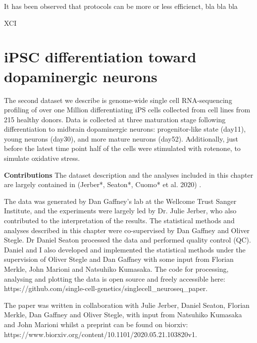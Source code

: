 It has been observed that protocols can be more or less efficienct, bla bla bla

XCI




\newpage


\section{iPSC differentiation toward dopaminergic neurons}

The second dataset we describe is genome-wide single cell RNA-sequencing profiling of over one Million differentiating iPS cells collected from cell lines from 215 healthy donors. 
Data is collected at three maturation stage following differentiation to midbrain dopaminergic neurons: progenitor-like state (day11), young neurons (day30), and more mature neurons (day52). 
Additionally, just before the latest time point half of the cells were stimulated with rotenone, to simulate oxidative stress. 

\vspace{5mm}

\begin{Abstract}

\hspace{-3mm}\textbf{Contributions} The dataset description and the analyses included in this chapter are largely contained in (Jerber*, Seaton*, Cuomo* et al. 2020) \cite{jerber2020population}.

\vspace{5mm}

The data was generated by Dan Gaffney’s lab at the Wellcome Trust Sanger Institute, and the experiments were largely led by Dr. Julie Jerber, who also contributed to the interpretation of the results. 
The statistical methods and analyses described in this chapter were co-supervised by Dan Gaffney and Oliver Stegle. 
Dr Daniel Seaton processed the data and performed quality control (QC). 
Daniel and I also developed and implemented the statistical methods under the supervision of Oliver Stegle and Dan Gaffney with some input from Florian Merkle, John Marioni and Natsuhiko Kumasaka.
The code for processing, analysing and plotting the data is open source and freely accessible here: https://github.com/single-cell-genetics/singlecell\_neuroseq\_paper.

\vspace{5mm}

The paper was written in collaboration with Julie Jerber, Daniel Seaton, Florian Merkle, Dan Gaffney and Oliver Stegle, with input from Natsuhiko Kumasaka and John Marioni whilst a preprint can be found on biorxiv: https://www.biorxiv.org/content/10.1101/2020.05.21.103820v1.

\end{Abstract}

